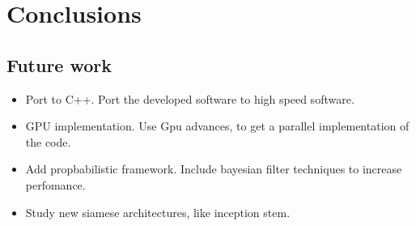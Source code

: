 \documentclass[12pt, a4paper, titlepage,twoside,openright]{article}
\begin{document}
\section{Conclusions}

\subsection{Future work}


\begin{itemize}

\item Port to C++. Port the developed software to high speed software.
\item GPU implementation. Use Gpu advances, to get a parallel implementation of the code.

\item Add propbabilistic framework. Include bayesian filter techniques to increase perfomance.


\item Study new siamese architectures, like inception stem.

\end{itemize}

{}

\end{document}

